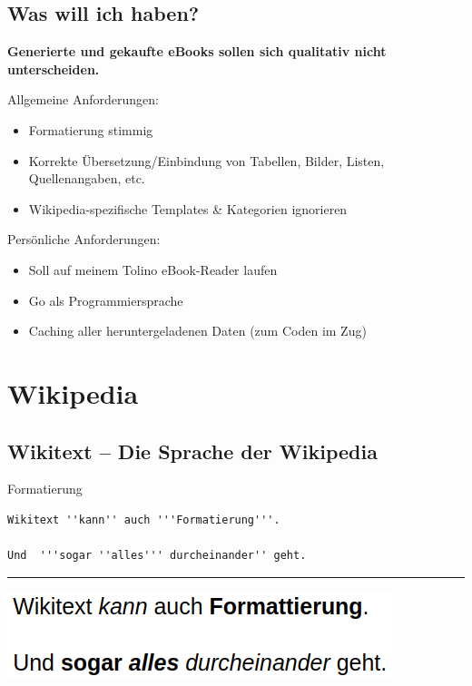 \documentclass[9pt]{beamer}
\begin{document}
	\subsection{Was will ich haben?}
	\begin{frame}
		\begin{center}
			\textbf{Generierte und gekaufte eBooks sollen sich qualitativ nicht unterscheiden.}
		\end{center}\pause
		Allgemeine Anforderungen:
		\begin{itemize}
			\item Formatierung stimmig
			\item Korrekte Übersetzung/Einbindung von Tabellen, Bilder, Listen, Quellenangaben, etc.
			\item Wikipedia-spezifische Templates \& Kategorien ignorieren
		\end{itemize}\pause\n
		Persönliche Anforderungen:
		\begin{itemize}
			\item Soll auf meinem Tolino eBook-Reader laufen
			\item Go als Programmiersprache
			\item Caching aller heruntergeladenen Daten (zum Coden im Zug)
		\end{itemize}
	\end{frame}

	\section{Wikipedia}	
	
	\subsection{Wikitext -- Die Sprache der Wikipedia}
	
	\begin{frame}[fragile]{Formatierung}
		\begin{verbatim}
Wikitext ''kann'' auch '''Formatierung'''.

Und  '''sogar ''alles''' durcheinander'' geht.
		\end{verbatim}
		\hrule\n
		\includegraphics[scale=0.35]{images/wikitext-example-0-formatting.png}
	\end{frame}
	
\end{document}
